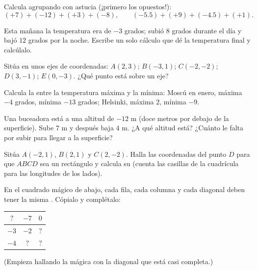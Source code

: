 \begin{exercise}[$\star$]\label{exo:g7:negatives:6}
Calcula agrupando con astucia (¡primero los opuestos!):
\[
(+7) + (-12) + (+3) + (-8), \qquad
(-5.5) + (+9) + (-4.5) + (+1).
\]
\end{exercise}

\begin{exercise}[$\star$]\label{exo:g7:negatives:7}
Esta mañana la temperatura era de $-3$ grados; subió $8$ grados
durante el día y bajó $12$ grados por la noche. Escribe un solo
cálculo que dé la temperatura final y calcúlalo.
\end{exercise}

\begin{exercise}[$\star$]\label{exo:g7:negatives:8}
Sitúa en unos ejes de coordenadas: $A(2, 3)$; $B(-3, 1)$; $C(-2, -2)$;
$D(3, -1)$; $E(0, -3)$. ¿Qué punto está sobre un eje?
\end{exercise}

\begin{exercise}[$\star\star$]\label{exo:g7:negatives:9}
Calcula la  entre la temperatura máxima y la mínima:
Moscú en enero, máxima $-4$ grados, mínima $-13$ grados; Helsinki, máxima
$2$, mínima $-9$.
\end{exercise}

\begin{exercise}[$\star\star$]\label{exo:g7:negatives:10}
Una buceadora está a una altitud de $-12$ m (doce metros por debajo de la superficie).
Sube $7$ m y después baja $4$ m. ¿A qué altitud está? ¿Cuánto
le falta por subir para llegar a la superficie?
\end{exercise}

\begin{exercise}[$\star\star$]\label{exo:g7:negatives:11}
Sitúa $A(-2, 1)$, $B(2, 1)$ y $C(2, -2)$. Halla las coordenadas del
punto $D$ para que $ABCD$ sea un rectángulo y calcula su 
(cuenta las casillas de la cuadrícula para las longitudes de los lados).
\end{exercise}

\begin{exercise}[$\star\star\star$]\label{exo:g7:negatives:12}
En el cuadrado mágico de abajo, cada fila, cada columna y cada diagonal deben tener la
misma . Cópialo y complétalo:
\begin{center}
\renewcommand{\arraystretch}{1.4}
\begin{tabular}{|c|c|c|}
\hline
$?$ & $-7$ & $0$ \\
\hline
$-3$ & $-2$ & $?$ \\
\hline
$-4$ & $?$ & $?$ \\
\hline
\end{tabular}
\end{center}
(Empieza hallando la  mágica con la diagonal que está casi
completa.)
\end{exercise}

